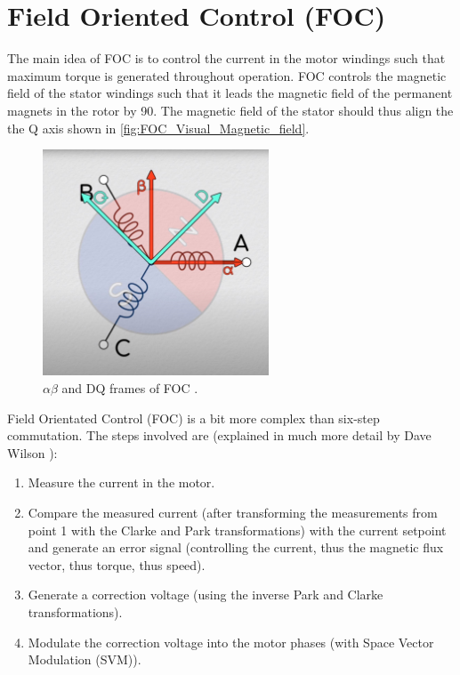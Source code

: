 \documentclass[]{report}
\begin{document}
\section{Field Oriented Control (FOC)} \label{section:FOC}
The main idea of FOC is to control the current in the motor windings such that maximum torque is generated throughout operation. FOC controls the magnetic field of the stator windings such that it leads the magnetic field of the permanent magnets in the rotor by 90\degree. The magnetic field of the stator should thus align the the Q axis shown in \autoref{fig:FOC_Visual_Magnetic_field}.

\begin{figure}[H]
	\centering
	\includegraphics[width=0.6\textwidth]{JantzenLee_Episode8_OnlyRotor.JPG}
	\caption{$\alpha$$\beta$ and DQ frames of FOC \cite{JantzenLeeUnderstandingMotors}.}
	\label{fig:FOC_Visual_Magnetic_field}
\end{figure} 

Field Orientated Control (FOC) is a bit more complex than six-step commutation. The steps involved are (explained in much more detail by Dave Wilson \cite{Teaching_Old_Motors_New_Tricks_--_Part_2}):
\begin{enumerate}
	\item Measure the current in the motor.
	\item Compare the measured current (after transforming the measurements from point 1 with the Clarke and Park transformations) with the current setpoint and generate an error signal (controlling the current, thus the magnetic flux vector, thus torque, thus speed).
	\item Generate a correction voltage (using the inverse Park and Clarke transformations).
	\item Modulate the correction voltage into the motor phases (with Space Vector Modulation (SVM)).
\end{enumerate}
\end{document}
